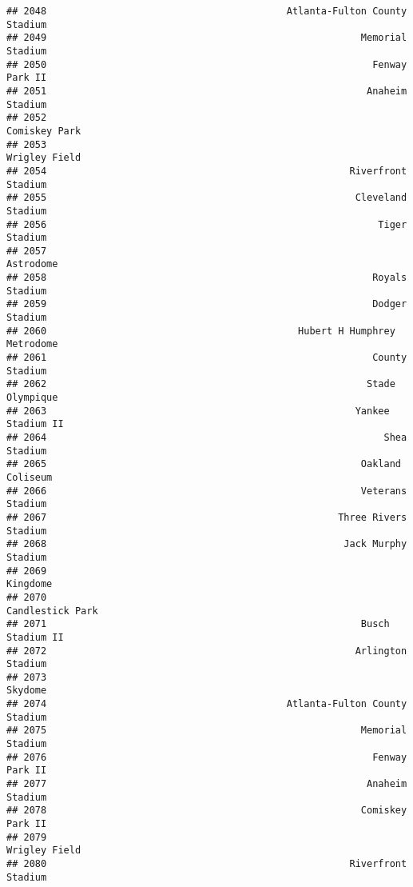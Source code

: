 \documentclass[]{article}
\begin{document}
\begin{verbatim}
## 2048                                          Atlanta-Fulton County Stadium
## 2049                                                       Memorial Stadium
## 2050                                                         Fenway Park II
## 2051                                                        Anaheim Stadium
## 2052                                                          Comiskey Park
## 2053                                                          Wrigley Field
## 2054                                                     Riverfront Stadium
## 2055                                                      Cleveland Stadium
## 2056                                                          Tiger Stadium
## 2057                                                              Astrodome
## 2058                                                         Royals Stadium
## 2059                                                         Dodger Stadium
## 2060                                            Hubert H Humphrey Metrodome
## 2061                                                         County Stadium
## 2062                                                        Stade Olympique
## 2063                                                      Yankee Stadium II
## 2064                                                           Shea Stadium
## 2065                                                       Oakland Coliseum
## 2066                                                       Veterans Stadium
## 2067                                                   Three Rivers Stadium
## 2068                                                    Jack Murphy Stadium
## 2069                                                               Kingdome
## 2070                                                       Candlestick Park
## 2071                                                       Busch Stadium II
## 2072                                                      Arlington Stadium
## 2073                                                                Skydome
## 2074                                          Atlanta-Fulton County Stadium
## 2075                                                       Memorial Stadium
## 2076                                                         Fenway Park II
## 2077                                                        Anaheim Stadium
## 2078                                                       Comiskey Park II
## 2079                                                          Wrigley Field
## 2080                                                     Riverfront Stadium

\end{verbatim}
\end{document}

